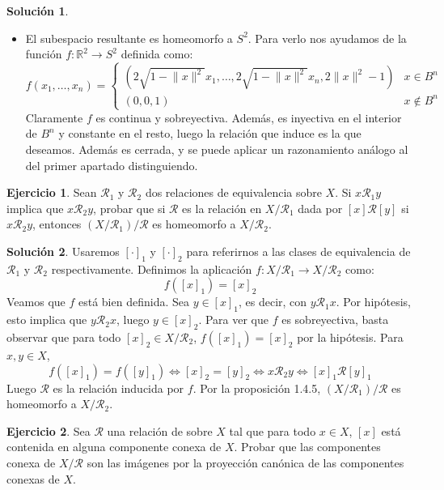\documentclass{article}
\theoremstyle{plain}
\theoremstyle{definition}
\newtheorem{exercise}{Ejercicio}
\newtheorem*{sol*}{Solución}
\providecommand{\norm}[1]{\lVert#1\rVert}
\begin{document}
\begin{sol*}
\begin{itemize}
	\item El subespacio resultante es homeomorfo a $S^2$. Para verlo nos ayudamos de la función $f:\mathbb{R}^2\to S^2$ definida como:
\[ f(x_1,\dots,x_n) = \begin{cases}
(2 \sqrt{1-\norm{x}^2}x_1, \dots, 2 \sqrt{1-\norm{x}^2}x_n, 2 \norm{x}^2-1) & x\in B^n\\
(0,0,1) & x\not \in B^n
\end{cases} \]
Claramente $f$ es continua y sobreyectiva. Además, es inyectiva en el interior de $B^n$ y constante en el resto, luego la relación que induce es la que deseamos. Además es cerrada, y se puede aplicar un razonamiento análogo al del primer apartado distinguiendo. 
\end{itemize}
\end{sol*}


\newpage
\begin{exercise}
Sean $\mathcal{R}_1$ y $\mathcal{R}_2$ dos relaciones de equivalencia sobre $X$. Si $x \mathcal{R}_1 y$ implica que $x \mathcal{R}_2 y$, probar que si $\mathcal{R}$ es la relación en $X/\mathcal{R}_1$ dada por $[x] \mathcal{R} [y]$ si $x \mathcal{R}_2 y$, entonces $(X/\mathcal{R}_1)/\mathcal{R}$ es homeomorfo a $X / \mathcal{R}_2$.
\end{exercise}
\begin{sol*}
Usaremos $[\cdot]_1$ y $[\cdot]_2$ para referirnos a las clases de equivalencia de $\mathcal{R}_1$ y $\mathcal{R}_2$ respectivamente. Definimos la aplicación $f : X/\mathcal{R}_1 \to X/\mathcal{R}_2$ como:
\[ f ([x]_1) = [x]_2 \]
Veamos que $f$ está bien definida. Sea $y \in [x]_1$, es decir, con $y \mathcal{R}_1 x$. Por hipótesis, esto implica que $y \mathcal{R}_2 x$, luego $y \in [x]_2$. Para ver que $f$ es sobreyectiva, basta observar que para todo $[x]_2 \in X/\mathcal{R}_2$, $f([x]_1) = [x]_2$ por la hipótesis. Para $x,y \in X$, 
	\[ f([x]_1) = f([y]_1) \Leftrightarrow [x]_2 = [y]_2 \Leftrightarrow x \mathcal{R}_2 y \Leftrightarrow [x]_1 \mathcal{R} [y]_1 \]
	Luego $\mathcal{R}$ es la relación inducida por $f$. Por la proposición 1.4.5,  $(X/\mathcal{R}_1)/\mathcal{R}$ es homeomorfo a $X/\mathcal{R}_2$.
\end{sol*}

\newpage
\begin{exercise}
Sea $\mathcal{R}$ una relación de sobre $X$ tal que para todo $x \in X$, $[x]$ está contenida en alguna componente conexa de $X$. Probar que las componentes conexa de $X/\mathcal{R}$ son las imágenes por la proyección canónica de las componentes conexas de $X$.
\end{exercise}
\end{document}
